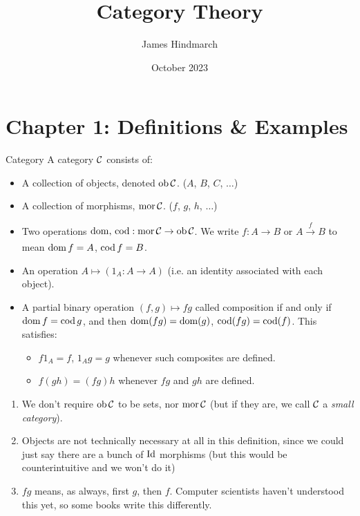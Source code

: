 \documentclass{article}
\title{Category Theory}
\author{James Hindmarch}
\date{October 2023}
\begin{document}
\maketitle
\tableofcontents

\newpage
\newlec






\section{Chapter 1: Definitions \& Examples}
\begin{fancydefine}{Category}
    A category $\mathcal{C}$ consists of:
    \begin{itemize}
        \item A collection of objects, denoted $\operatorname{ob} \mathcal{C}$. ($A$, $B$, $C$, $\dots$)
        \item A collection of morphisms, $\operatorname{mor} \mathcal{C}$. ($f$, $g$, $h$, $\dots$)
        \item Two operations $\operatorname{dom} , \, \operatorname{cod} : \operatorname{mor} \mathcal{C} \to \operatorname{ob} \mathcal{C}$. We write $f: A \to B$ or $A \xrightarrow[]{f} B$ to mean $\operatorname{dom} f = A$, $\operatorname{cod} f = B$.
        \item An operation $A \mapsto (1_{A} : A \to A)$ (i.e. an identity associated with each object).
        \item A partial binary operation $(f,g) \mapsto fg$ called composition if and only if $\operatorname{dom} f = \operatorname{cod} g$, and then $\operatorname{dom}(fg)=\operatorname{dom}(g)$, $\operatorname{cod}(fg)=\operatorname{cod}(f)$. This satisfies: \begin{itemize}
            \item $f1_{A} = f$, $1_{A}g=g$ whenever such composites are defined.
            \item $f(gh) = (fg)h$ whenever $fg$ and $gh$ are defined.
        \end{itemize}
    \end{itemize}
\end{fancydefine}
\remarks \hspace{0.1cm}
\begin{enumerate}
    \item[(1)] We don't require $\operatorname{ob} \mathcal{C}$ to be sets, nor $\operatorname{mor} \mathcal{C}$ (but if they are, we call $\mathcal{C}$ a \textit{small category}).
    \item[(2)] Objects are not technically necessary at all in this definition, since we could just say there are a bunch of $\operatorname{Id}$ morphisms (but this would be counterintuitive and we won't do it)
    \item[(3)] $fg$ means, as always, first $g$, then $f$. Computer scientists haven't understood this yet, so some books write this differently.
\end{enumerate}
\end{document}
